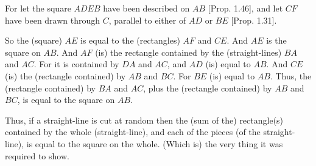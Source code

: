 \begin{Parallel}{}{}
{For let the square $ADEB$ have been described on $AB$ [Prop. 1.46], and
let $CF$ have been drawn through $C$, parallel to either of $AD$ or $BE$ [Prop. 1.31].

So the (square) $AE$ is equal to the (rectangles) $AF$ and $CE$. And $AE$ is the square on $AB$.  And $AF$ (is) the rectangle contained by the (straight-lines) $BA$ and $AC$. For it is contained by $DA$ and $AC$, and $AD$ (is) equal to $AB$. 
And $CE$ (is) the (rectangle contained) by $AB$ and $BC$. For $BE$ (is) equal
to $AB$. Thus, the (rectangle contained) by $BA$ and $AC$, plus the
(rectangle contained) by $AB$ and $BC$, is equal to the square on $AB$.

Thus, if a straight-line is cut at random then the (sum of the) rectangle(s) contained by the whole
(straight-line), and each of the pieces (of the straight-line), is equal to the square on the whole. (Which is) the very thing it was required to show.}
\end{Parallel}


\vspace{7pt}{\footnotesize \noindent$^\dag$ This proposition is a geometric version
of the algebraic identity: $a\,b+a\,c=a^2$ if $a=b+c$.}

